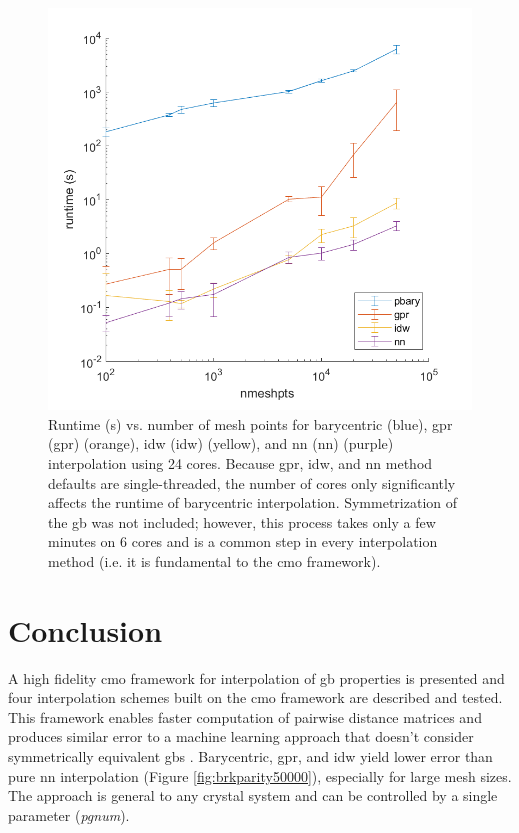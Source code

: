 \documentclass[preprint,12pt]{elsarticle}
\begin{document}
\begin{figure}
    \centering
    \includegraphics{runtime.png}
    \caption{Runtime (s) vs. number of mesh points for barycentric (blue), \acrlong{gpr} (\acrshort{gpr}) (orange), \acrlong{idw} (\acrshort{idw}) (yellow), and \acrlong{nn} (\acrshort{nn}) (purple) interpolation using 24 cores. Because \acrshort{gpr}, \acrshort{idw}, and \acrshort{nn} method defaults are single-threaded, the number of cores only significantly affects the runtime of barycentric interpolation. Symmetrization of the \acrlong{gb} was not included; however, this process takes only a few minutes on 6 cores and is a common step in every interpolation method (i.e. it is fundamental to the \acrlong{cmo} framework).}
    \label{fig:runtime}
\end{figure}

\section{Conclusion} \label{sec:conclusion}

A high fidelity \gls{cmo} framework for interpolation of \gls{gb} properties is presented and four interpolation schemes built on the \gls{cmo} framework are described and tested. This framework enables faster computation of pairwise distance matrices and produces similar error to a machine learning approach that doesn't consider symmetrically equivalent \glspl{gb} \cite{echeverrirestrepoUsingArtificialNeural2014}. Barycentric, \gls{gpr}, and \gls{idw} yield lower error than pure \gls{nn} interpolation (Figure \ref{fig:brkparity50000}), especially for large mesh sizes. The approach is general to any crystal system and can be controlled by a single parameter (\textit{pgnum}). %
    
\end{document}
